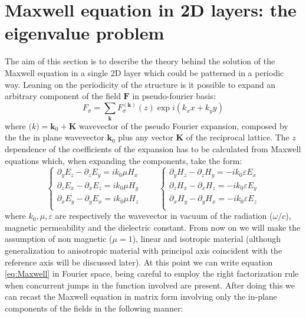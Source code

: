 \documentclass[a4paper,10pt]{report}
\begin{document}
\section{Maxwell equation in 2D layers: the eigenvalue problem}
The aim of this section is to describe the theory behind the solution of the Maxwell equation in a single 2D layer which could be patterned in a periodic way. Leaning on the periodicity of the structure is it possible to expand an arbitrary component of the field $\mathbf{F}$ in pseudo-fourier basis:
\begin{equation}
F_\sigma = \sum_\mathbf{k}F_\sigma^{(\mathbf{k})}(z)\exp{i(k_xx+k_yy)}
\end{equation} 
where $\mathbf(k)=\mathbf{k}_0 + \mathbf{K}$ wavevector of the pseudo Fourier expansion, composed by the the in plane wavevector $\mathbf{k}_0$ plus any vector $\mathbf{K}$ of the reciprocal lattice. The $z$ dependence of the coefficients of the expansion has to be calculated from Maxwell equations which, when expanding the components, take the form:
\begin{equation} \label{eq:Maxwell}
\left\{\begin{array}{c}
\partial_y E_z - \partial_z E_y = ik_0 \mu H_x \\
\partial_z E_x - \partial_x E_z = ik_0 \mu H_y \\
\partial_x E_y - \partial_y E_x = ik_0 \mu H_z \\
\end{array} \right.
\qquad
\left\{\begin{array}{c}
\partial_y H_z - \partial_z H_y = -ik_0 \varepsilon E_x \\
\partial_z H_x - \partial_x H_z = -ik_0 \varepsilon E_y \\
\partial_x H_y - \partial_y H_x = -ik_0 \varepsilon E_z \\
\end{array} \right.
\end{equation}  
where $k_0,\mu,\varepsilon$ are respectively the wavevector in vacuum of the radiation ($\omega/c$), magnetic permeability and the dielectric constant. From now on we will make the assumption of non magnetic ($\mu=1$), linear and isotropic material (although generalization to anisotropic material with principal axis coincident with the reference axis will be discussed later).
At this point we can write equation \ref{eq:Maxwell} in Fourier space, being careful to employ the right factorization rule when concurrent jumps in the function involved are present. After doing this we can recast the Maxwell equation in matrix form involving only the in-plane components of the fields in the following manner:
\end{document}
